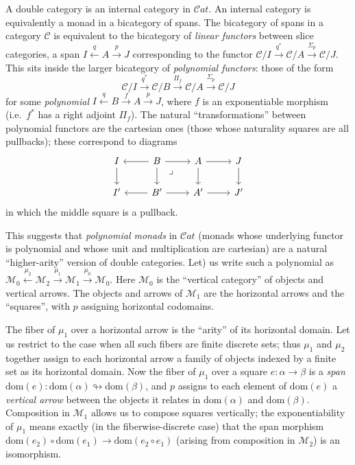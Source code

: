 \documentclass{article}
\theoremstyle{definition}
\let\sto\looparrowright
\def\M{\mathcal{M}}
\def\Cat{\mathcal{C}\mathit{at}}
\def\sC{\mathscr{C}}
\def\dom{\mathrm{dom}}
\let\xto\xrightarrow
\let\xot\xleftarrow
\begin{document}
A double category is an internal category in $\Cat$.
An internal category is equivalently a monad in a bicategory of spans.
The bicategory of spans in a category $\sC$ is equivalent to the bicategory of \emph{linear functors} between slice categories, a span $I \xot{q} A \xto{p} J$ corresponding to the functor $\sC/I \xto{q^*} \sC/A \xto{\Sigma_p} \sC/J$.
This sits inside the larger bicategory of \emph{polynomial functors}: those of the form
\[ \sC/I \xto{q^*} \sC/B \xto{\Pi_f} \sC/A \xto{\Sigma_p} \sC/J \]
for some \emph{polynomial} $I \xot{q} B \xto{f} A \xto{p} J$, where $f$ is an exponentiable morphism (i.e.\ $f^*$ has a right adjoint $\Pi_f$).
The natural ``transformations'' between polynomial functors are the cartesian ones (those whose naturality squares are all pullbacks); these correspond to diagrams 
\begin{equation}
\begin{tikzcd}
  I \ar[d] & B \ar[l] \ar[r]\ar[d] \ar[dr,phantom,near start,"\lrcorner"] & A \ar[r]\ar[d] & J\ar[d] \\
  I' & B' \ar[l] \ar[r] & A' \ar[r] & J'
\end{tikzcd}\label{eq:poly-cartmap}
\end{equation}
in which the middle square is a pullback.

This suggests that \emph{polynomial monads} in $\Cat$ (monads whose underlying functor is polynomial and whose unit and multiplication are cartesian) are a natural ``higher-arity'' version of double categories.
Let) us write such a polynomial as $\M_0 \xot{\mu_2} \M_2 \xto{\mu_1} \M_1 \xto{\mu_0} \M_0$.
Here $\M_0$ is the ``vertical category'' of objects and vertical arrows.
The objects and arrows of $\M_1$ are the horizontal arrows and the ``squares'', with $p$ assigning horizontal codomains.

The fiber of $\mu_1$ over a horizontal arrow is the ``arity'' of its horizontal domain.
Let us restrict to the case when all such fibers are finite discrete sets; thus $\mu_1$ and $\mu_2$ together assign to each horizontal arrow a family of objects indexed by a finite set as its horizontal domain.
Now the fiber of $\mu_1$ over a square $e:\alpha\to\beta$ is a \emph{span} $\dom(e):\dom(\alpha)\sto\dom(\beta)$, and $p$ assigns to each element of $\dom(e)$ a \emph{vertical arrow} between the objects it relates in $\dom(\alpha)$ and $\dom(\beta)$.
Composition in $\M_1$ allows us to compose squares vertically; the exponentiability of $\mu_1$ means exactly (in the fiberwise-discrete case) that the span morphism $\dom(e_2) \circ \dom(e_1) \to \dom(e_2\circ e_1)$ (arising from composition in $\M_2$) is an isomorphism.
\end{document}
